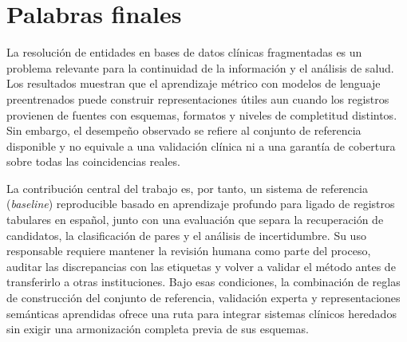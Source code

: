 \section{Palabras finales}

La resolución de entidades en bases de datos clínicas fragmentadas es un problema relevante para la continuidad de la información y el análisis de salud. Los resultados muestran que el aprendizaje métrico con modelos de lenguaje preentrenados puede construir representaciones útiles aun cuando los registros provienen de fuentes con esquemas, formatos y niveles de completitud distintos. Sin embargo, el desempeño observado se refiere al conjunto de referencia disponible y no equivale a una validación clínica ni a una garantía de cobertura sobre todas las coincidencias reales.

La contribución central del trabajo es, por tanto, un sistema de referencia (\textit{baseline}) reproducible basado en aprendizaje profundo para ligado de registros tabulares en español, junto con una evaluación que separa la recuperación de candidatos, la clasificación de pares y el análisis de incertidumbre. Su uso responsable requiere mantener la revisión humana como parte del proceso, auditar las discrepancias con las etiquetas y volver a validar el método antes de transferirlo a otras instituciones. Bajo esas condiciones, la combinación de reglas de construcción del conjunto de referencia, validación experta y representaciones semánticas aprendidas ofrece una ruta para integrar sistemas clínicos heredados sin exigir una armonización completa previa de sus esquemas.
